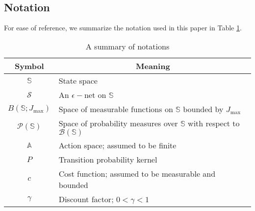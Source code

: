 \documentclass[12pt,technote,onecolumn]{IEEEtran}
\begin{document}
\subsection{Notation}

For ease of reference, we summarize the notation used in this paper in Table \ref{tab:notations}.

\begin{table}[!tph]
	\centering
	\caption{A summary of notations \label{tab:notations}}
	\begin{tabular}{|c|l|}
		\hline
		Symbol                                                                 & \multicolumn{1}{c|}{Meaning}                                                                         \\ \hline
		$\mathbb{S}$                                                           & State space                                                                                          \\ \hline
		$\mathcal{S}$                                                          & An $\epsilon-$net on $\mathbb{S}$                                                                    \\ \hline
		$B\left(\mathbb{S};J_{\max}\right)$                                   & Space of measurable functions on $\mathbb{S}$ bounded by  $J_{\max}$                                              \\ \hline
		$\mathcal{P\left(\mathbb{S}\right)}$                                   & Space of probability measures over $\mathbb{S}$ with respect to $\mathcal{B}\left(\mathbb{S}\right)$ \\ \hline
		$\mathbb{A}$                                                           & Action space; assumed to be finite                                                                   \\ \hline
		$P$                                                                    & Transition probability kernel                                                                        \\ \hline
		$c$                                                                    & Cost function; assumed to be measurable and bounded                                                  \\ \hline
		$\gamma$                                                               & Discount factor; $0<\gamma<1$                                                                        \\ \hline

\end{tabular}
\end{table}
\end{document}
